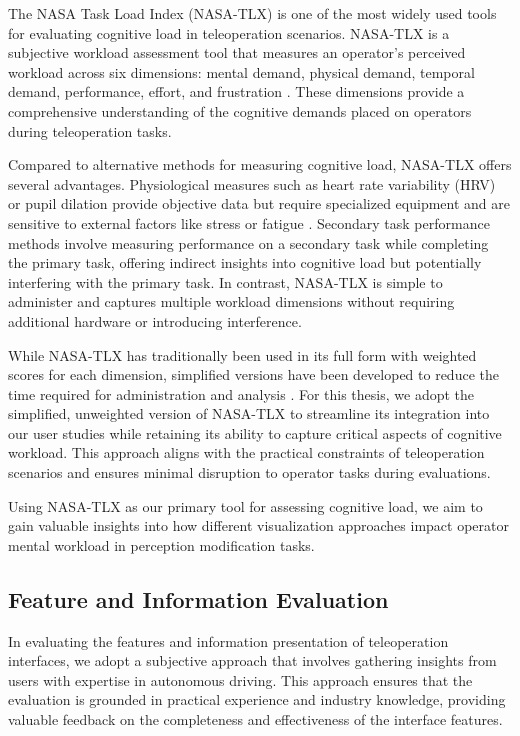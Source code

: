 The NASA Task Load Index (NASA-TLX) is one of the most widely used tools for evaluating cognitive load in teleoperation scenarios. NASA-TLX is a subjective workload assessment tool that measures an operator's perceived workload across six dimensions: mental demand, physical demand, temporal demand, performance, effort, and frustration \cite{hart1988development}. These dimensions provide a comprehensive understanding of the cognitive demands placed on operators during teleoperation tasks.

Compared to alternative methods for measuring cognitive load, NASA-TLX offers several advantages. Physiological measures such as heart rate variability (HRV) or pupil dilation provide objective data but require specialized equipment and are sensitive to external factors like stress or fatigue \cite{wickens2008multiple}. Secondary task performance methods involve measuring performance on a secondary task while completing the primary task, offering indirect insights into cognitive load but potentially interfering with the primary task. In contrast, NASA-TLX is simple to administer and captures multiple workload dimensions without requiring additional hardware or introducing interference.

While NASA-TLX has traditionally been used in its full form with weighted scores for each dimension, simplified versions have been developed to reduce the time required for administration and analysis \cite{hart2006nasa}. For this thesis, we adopt the simplified, unweighted version of NASA-TLX to streamline its integration into our user studies while retaining its ability to capture critical aspects of cognitive workload. This approach aligns with the practical constraints of teleoperation scenarios and ensures minimal disruption to operator tasks during evaluations.

Using NASA-TLX as our primary tool for assessing cognitive load, we aim to gain valuable insights into how different visualization approaches impact operator mental workload in perception modification tasks.
\subsection{Feature and Information Evaluation}
In evaluating the features and information presentation of teleoperation interfaces, we adopt a subjective approach that involves gathering insights from users with expertise in autonomous driving. This approach ensures that the evaluation is grounded in practical experience and industry knowledge, providing valuable feedback on the completeness and effectiveness of the interface features.

